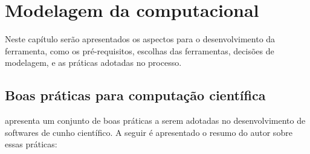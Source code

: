 \chapter{Modelagem da computacional}

Neste capítulo serão apresentados os aspectos para o desenvolvimento da ferramenta, como os pré-requisitos, escolhas das ferramentas, decisões de modelagem, e as práticas adotadas no processo.

\section{Boas práticas para computação científica}

 apresenta um conjunto de boas práticas a serem adotadas no desenvolvimento de softwares de cunho científico. A seguir é apresentado o resumo do autor sobre essas práticas:

